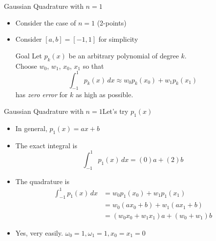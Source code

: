 \documentclass[10pt]{beamer}
\begin{document}
\begin{frame}{Gaussian Quadrature with $n=1$}
  \begin{itemize}
    \item Consider the case of $n=1$ (2-points)
    \item Consider $[a,b] = [-1,1]$ for simplicity

    \bigskip
    \begin{block}{Goal}
        Let $p_k(x)$ be an arbitrary polynomial of degree $k$.\\
        Choose $w_0$, $w_1$, $x_0$, $x_1$ so that
            \begin{equation*}
              \int_{-1}^{1} p_k(x)\, dx \approx w_0 p_k(x_0) + w_1 p_k(x_1)
            \end{equation*}
        has \emph{zero error} for $k$ as high as possible.
    \end{block}
  \end{itemize}
\end{frame}
\begin{frame}{Gaussian Quadrature with $n=1$}{Let's try $p_1(x)$}
\begin{itemize}
    \item In general, $p_1(x) = ax + b$
    \item The exact integral is 
        \begin{equation*}
            \int_{-1}^1 p_1(x) \,dx = (0) a +  (2)b \tag{*} 
        \end{equation*}
    \item The quadrature is 
        \begin{align*}
        \int_{-1}^{1} p_1(x)\, dx &= w_0 p_1(x_0) + w_1 p_1(x_1)\\
                                  &= w_0 (a x_0 + b) + w_1 (a x_1 + b) \\
                                  & = (w_0  x_0 + w_1  x_1)a + (w_0+w_1) b \tag{**}
        \end{align*}
    \item<2> Yes, very easily. $\omega_0=1,\omega_1=1,x_0=x_1=0$
\end{itemize}
\end{frame}
\end{document}
